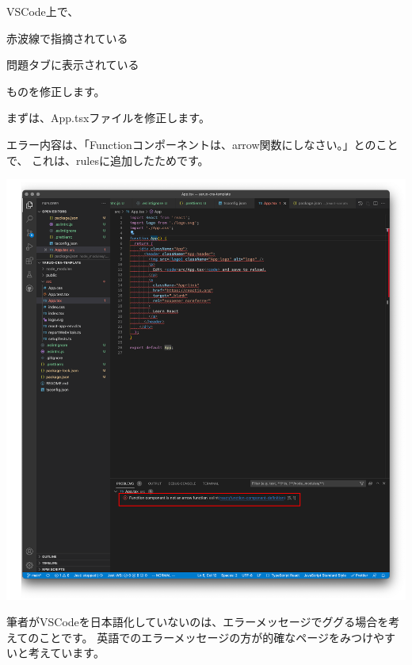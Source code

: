 VSCode上で、\\[0pt]

\begin{starteritemize}
\item 赤波線で指摘されている
\item 問題タブに表示されている
\end{starteritemize}

\vspace*{\baselineskip}

ものを修正します。

\vspace*{\baselineskip}

まずは、App.tsxファイルを修正します。

\vspace*{\baselineskip}

エラー内容は、「Functionコンポーネントは、arrow関数にしなさい。」とのことで、
これは、rulesに追加したためです。

\begin{reviewimage}%
\includegraphics[width=0.8\maxwidth]{./images/02-create-react-app/cra-fix_app_tsx.png}%
\label{image:02-create-react-app:cra-fix_app_tsx}
\end{reviewimage}
\begin{starternote}[]{}

筆者がVSCodeを日本語化していないのは、エラーメッセージでググる場合を考えてのことです。
英語でのエラーメッセージの方が的確なページをみつけやすいと考えています。

\end{starternote}

